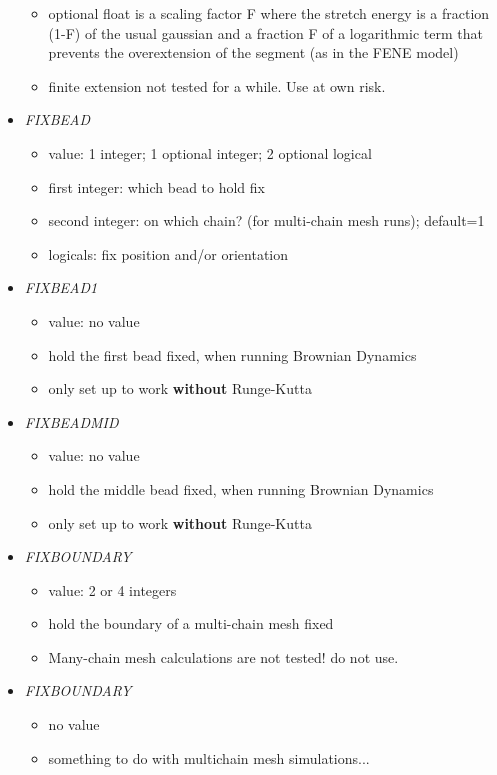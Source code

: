\documentclass[12pt]{article}
\begin{document}
\begin{itemize}
\begin{itemize}
    \item optional float is a scaling factor F where the stretch energy is a fraction (1-F) of the usual gaussian  and a fraction F of a logarithmic term that prevents the overextension of the segment (as in the FENE model)
    \item {\color{red} finite extension not tested for a while. Use at own risk.}
  \end{itemize}
%
\item {\it FIXBEAD}
  \begin{itemize}
    \item  value: 1 integer; 1 optional integer; 2 optional logical
    \item first integer: which bead to hold fix
    \item second integer: on which chain? (for multi-chain mesh runs); default=1
    \item logicals: fix position and/or orientation
  \end{itemize}
%
\item {\it FIXBEAD1}
  \begin{itemize}
    \item  value: no value
    \item hold the first bead fixed, when running Brownian Dynamics
    \item only set up to work {\bf without} Runge-Kutta
  \end{itemize}
%
\item {\it FIXBEADMID}
  \begin{itemize}
    \item  value: no value
    \item hold the middle bead fixed, when running Brownian Dynamics
    \item only set up to work {\bf without} Runge-Kutta
  \end{itemize}
%
\item {\it FIXBOUNDARY}
  \begin{itemize}
    \item  value: 2 or 4 integers
    \item hold the boundary of a multi-chain mesh fixed
    \item {\color{red} Many-chain mesh calculations are not tested! do not use.}
  \end{itemize}
%
\item {\it FIXBOUNDARY}
  \begin{itemize}
    \item  no value
    \item something to do with multichain mesh simulations...

\end{itemize}
\end{itemize}
\end{document}
